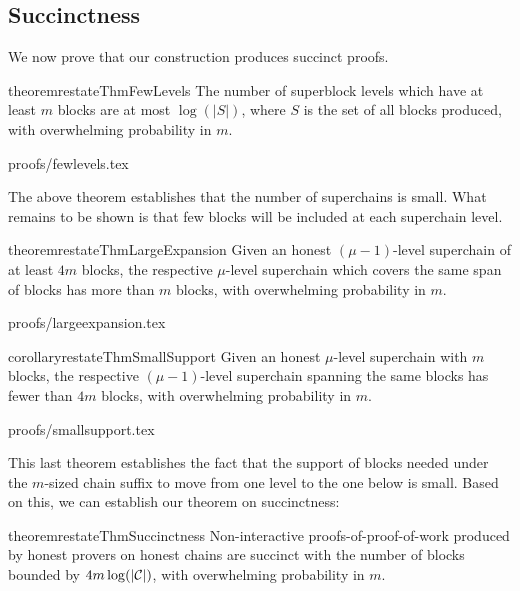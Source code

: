 \subsection{Succinctness}

We now prove that our construction produces succinct proofs.

\begin{restatable}{theorem}{restateThmFewLevels}
    \label{thm.few-levels}
    The number of superblock levels which have at least $m$ blocks are at most
    $\log(|S|)$, where $S$ is the set of all blocks produced, with overwhelming
    probability in $m$.
\end{restatable}

\ifonecolumn
{proofs/fewlevels.tex}
\fi

The above theorem establishes that the number of superchains is small. What
remains to be shown is that few blocks will be included at each superchain
level.

\begin{restatable}{theorem}{restateThmLargeExpansion}
    \label{thm.large-expansion}
    Given an honest $(\mu - 1)$-level superchain of at least $4m$ blocks,
    the respective $\mu$-level
    superchain which covers the same span of blocks has more than $m$ blocks,
    with overwhelming probability in $m$.
\end{restatable}

\ifonecolumn
{proofs/largeexpansion.tex}
\fi

\begin{restatable}{corollary}{restateThmSmallSupport}
    \label{crly.small-support}
    Given an honest $\mu$-level superchain with $m$ blocks, the respective
    $(\mu - 1)$-level superchain spanning the same blocks has fewer than $4m$
    blocks, with overwhelming probability in $m$.
\end{restatable}

\ifonecolumn
{proofs/smallsupport.tex}
\fi

This last theorem establishes the fact that the support of blocks needed under
the $m$-sized chain suffix to move from one level to the one below is small.
Based on this, we can establish our theorem on succinctness:

\begin{restatable}{theorem}{restateThmSuccinctness}
    \label{thm.succinctness}
    Non-interactive proofs-of-proof-of-work produced by honest provers on
    honest chains are succinct with the number of blocks bounded by $4m
    \log(|\mathcal{C}|)$, with overwhelming probability in $m$.
\end{restatable}

